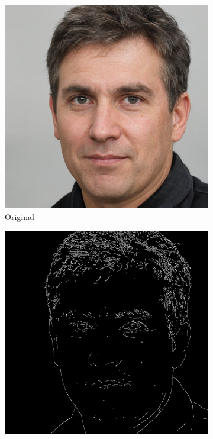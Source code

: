 \documentclass{70_styles/svproc}
\begin{document}
\begin{figure}
\begin{subfigure}[b]{0.2\textwidth}
     \end{subfigure}
     \par\medskip
     \begin{subfigure}[b]{0.2\textwidth}
         \centering
         \includegraphics[width=\textwidth]{70_figures/seed0154.png}
         \caption{Original}
     \end{subfigure}
     \begin{subfigure}[b]{0.2\textwidth}
         \centering
         \includegraphics[width=\textwidth]{70_figures/canny-seed0154.png}

\end{subfigure}
\end{figure}
\end{document}
